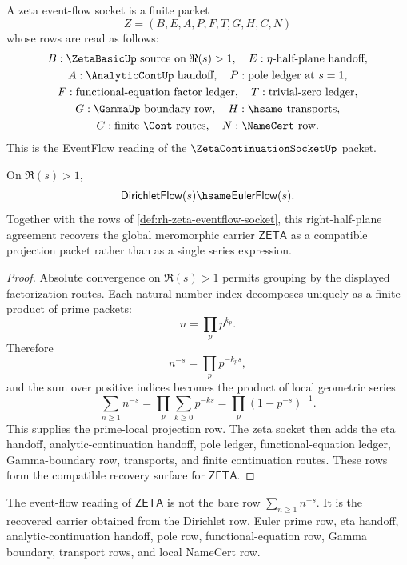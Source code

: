 \begin{definition}
\label{def:rh-zeta-eventflow-socket}
A zeta event-flow socket is a finite packet
$$
Z=(B,E,A,P,F,T,G,H,C,N)
$$
whose rows are read as follows:
$$
\begin{gathered}
B:\ZetaBasicUp\text{ source on }\Re(s)>1,\quad
E:\eta\text{-half-plane handoff},\\
A:\AnalyticContUp\text{ handoff},\quad
P:\text{pole ledger at }s=1,\\
F:\text{functional-equation factor ledger},\quad
T:\text{trivial-zero ledger},\\
G:\GammaUp\text{ boundary row},\quad
H:\hsame\text{ transports},\\
C:\text{finite }\Cont\text{ routes},\quad
N:\NameCert\text{ row}.
\end{gathered}
$$
This is the EventFlow reading of the $\ZetaContinuationSocketUp$ packet.
\end{definition}

\begin{proposition}
\label{prop:rh-zeta-recovery-from-eventflow-socket}
On $\Re(s)>1$,
$$
\mathsf{DirichletFlow}(s)\hsame\mathsf{EulerFlow}(s).
$$
Together with the rows of \autoref{def:rh-zeta-eventflow-socket}, this
right-half-plane agreement recovers the global meromorphic carrier
$\mathsf{ZETA}$ as a compatible projection packet rather than as a single
series expression.
\end{proposition}

\begin{proof}
Absolute convergence on $\Re(s)>1$ permits grouping by the displayed
factorization routes.  Each natural-number index decomposes uniquely as a
finite product of prime packets:
$$
n=\prod_p p^{k_p}.
$$
Therefore
$$
n^{-s}=\prod_p p^{-k_ps},
$$
and the sum over positive indices becomes the product of local geometric
series
$$
\sum_{n\geq 1}n^{-s}
=
\prod_p\sum_{k\geq 0}p^{-ks}
=
\prod_p(1-p^{-s})^{-1}.
$$
This supplies the prime-local projection row.  The zeta socket then adds the
eta handoff, analytic-continuation handoff, pole ledger, functional-equation
ledger, Gamma-boundary row, transports, and finite continuation routes.  These
rows form the compatible recovery surface for $\mathsf{ZETA}$.
\end{proof}

\begin{corollary}
\label{cor:rh-zeta-not-exhausted-by-series-flow}
The event-flow reading of $\mathsf{ZETA}$ is not the bare row
$\sum_{n\geq 1}n^{-s}$.  It is the recovered carrier obtained from the
Dirichlet row, Euler prime row, eta handoff, analytic-continuation handoff,
pole row, functional-equation row, Gamma boundary, transport rows, and local
NameCert row.
\end{corollary}

